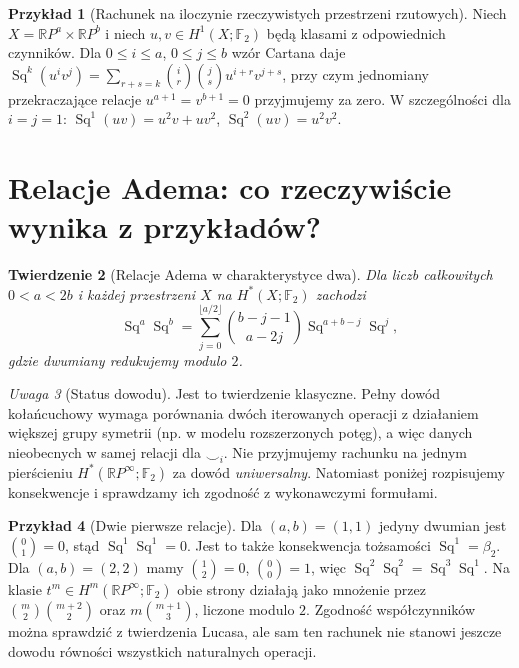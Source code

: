 \documentclass[11pt,a4paper,oneside]{report}
\newcommand{\F}{\mathbb{F}}
\newcommand{\R}{\mathbb{R}}
\theoremstyle{plain}
\newtheorem{twierdzenie}{Twierdzenie}[section]
\theoremstyle{definition}
\newtheorem{przyklad}[twierdzenie]{Przykład}
\theoremstyle{remark}
\newtheorem{uwaga}[twierdzenie]{Uwaga}
\begin{document}
\begin{przyklad}[Rachunek na iloczynie rzeczywistych przestrzeni rzutowych]
Niech $X=\R P^{a}\times\R P^{b}$ i niech
$u,v\in H^1(X;\F_2)$ będą klasami z odpowiednich czynników.
Dla $0\le i\le a$, $0\le j\le b$ wzór Cartana daje
$\operatorname{Sq}^{k}(u^iv^j)=
\sum_{r+s=k}\binom ir\binom js u^{i+r}v^{j+s}$,
przy czym jednomiany przekraczające relacje
$u^{a+1}=v^{b+1}=0$ przyjmujemy za zero.
W szczególności dla $i=j=1$:
$\operatorname{Sq}^1(uv)=u^2v+uv^2$,
$\operatorname{Sq}^2(uv)=u^2v^2$.
\end{przyklad}

\section{Relacje Adema: co rzeczywiście wynika z przykładów?}
\begin{twierdzenie}[Relacje Adema w charakterystyce dwa]
\label{thm:adem-v8}
Dla liczb całkowitych $0<a<2b$ i każdej przestrzeni $X$
na $H^*(X;\F_2)$ zachodzi
\[
\operatorname{Sq}^a\operatorname{Sq}^b
 =\sum_{j=0}^{\lfloor a/2\rfloor}
 \binom{b-j-1}{a-2j}
 \operatorname{Sq}^{a+b-j}\operatorname{Sq}^{j},
\]
gdzie dwumiany redukujemy modulo $2$.
\end{twierdzenie}
\begin{uwaga}[Status dowodu]
Jest to twierdzenie klasyczne. Pełny dowód kołańcuchowy
wymaga porównania dwóch iterowanych operacji z działaniem
większej grupy symetrii (np. w modelu rozszerzonych potęg),
a więc danych nieobecnych w samej relacji dla $\smile_i$.
Nie przyjmujemy rachunku na jednym pierścieniu
$H^*(\R P^\infty;\F_2)$ za dowód \emph{uniwersalny}.
Natomiast poniżej rozpisujemy konsekwencje i sprawdzamy ich
zgodność z wykonawczymi formułami.
\end{uwaga}
\begin{przyklad}[Dwie pierwsze relacje]
Dla $(a,b)=(1,1)$ jedyny dwumian jest
$\binom{0}{1}=0$, stąd
$\operatorname{Sq}^1\operatorname{Sq}^1=0$.
Jest to także konsekwencja tożsamości
$\operatorname{Sq}^1=\beta_2$.
Dla $(a,b)=(2,2)$ mamy
$\binom{1}{2}=0$, $\binom{0}{0}=1$, więc
$\operatorname{Sq}^2\operatorname{Sq}^2=
\operatorname{Sq}^3\operatorname{Sq}^1$.
Na klasie $t^m\in H^m(\R P^\infty;\F_2)$
obie strony działają jako mnożenie przez
$\binom m2\binom{m+2}2$ oraz
$m\binom{m+1}3$, liczone modulo $2$.
Zgodność współczynników można sprawdzić z twierdzenia Lucasa,
ale sam ten rachunek nie stanowi jeszcze dowodu
równości wszystkich naturalnych operacji.
\end{przyklad}
\end{document}
